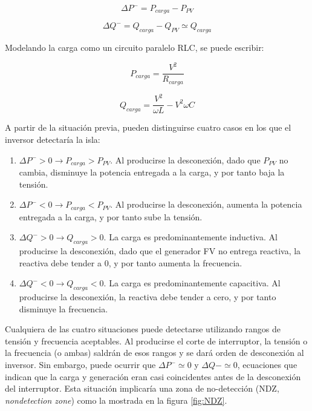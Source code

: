 \begin{equation}
\Delta P^{-}=P_{carga}-P_{PV}\end{equation}


\begin{equation}
\Delta Q^{-}=Q_{carga}-Q_{PV}\simeq Q_{carga}\end{equation}


Modelando la carga como un circuito paralelo RLC, se puede escribir:

\begin{equation}
P_{carga}=\frac{V^{2}}{R_{carga}}\end{equation}


\begin{equation}
Q_{carga}=\frac{V^{2}}{\omega L}-V^{2}\omega C\end{equation}


A partir de la situación previa, pueden distinguirse cuatro casos
en los que el inversor detectaría la isla: 
\begin{enumerate}
\item $\Delta P^{-}>0\rightarrow P_{carga}>P_{PV}$. Al producirse la desconexión,
dado que $P_{PV}$ no cambia, disminuye la potencia entregada a la
carga, y por tanto baja la tensión.
\item $\Delta P^{-}<0\rightarrow P_{carga}<P_{PV}$. Al producirse la desconexión,
aumenta la potencia entregada a la carga, y por tanto sube la tensión.
\item $\Delta Q^{-}>0\rightarrow Q_{carga}>0$. La carga es predominantemente
inductiva. Al producirse la desconexión, dado que el generador FV
no entrega reactiva, la reactiva debe tender a 0, y por tanto aumenta
la frecuencia.
\item $\Delta Q^{-}<0\rightarrow Q_{carga}<0$. La carga es predominantemente
capacitiva. Al producirse la desconexión, la reactiva debe tender
a cero, y por tanto disminuye la frecuencia.
\end{enumerate}
Cualquiera de las cuatro situaciones puede detectarse utilizando rangos
de tensión y frecuencia aceptables. Al producirse el corte de interruptor,
la tensión o la frecuencia (o ambas) saldrán de esos rangos y se dará
orden de desconexión al inversor.
Sin embargo, puede ocurrir que $\Delta P^{-}\simeq0$
y $\Delta Q-\simeq0$, ecuaciones que indican que la carga y generación
eran casi coincidentes antes de la desconexión del interruptor. Esta
situación implicaría una zona de no-detección (NDZ, \emph{nondetection
zone}) como la mostrada en la figura \ref{fig:NDZ}. 

